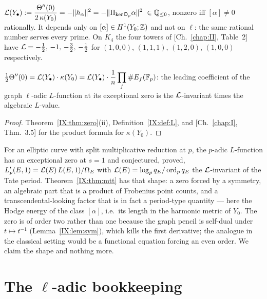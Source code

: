 \begin{definition}\label{IX:def:L}
$\displaystyle\mathcal{L}(Y_\bullet):=\frac{\Theta''(0)}{2\,\kappa(Y_0)}=-\|h_\alpha\|^{2}
=-\|\Pi_{\ker\mathsf D_p}\alpha\|^{2}\ \in\mathbb{Q}_{\le0}$, nonzero iff $[\alpha]\neq0$
rationally. It depends only on $[\alpha]\in H^{1}(Y_0;\mathbb{Z})$ and not on $\ell$: the same
rational number serves every prime. On $K_4$ the four towers of [Ch.~\ref{chap:II}, Table~2] have
$\mathcal{L}=-\frac12,\,-1,\,-\frac32,\,-\frac12$ for $(1,0,0)$, $(1,1,1)$, $(1,2,0)$, $(1,0,0)$
respectively.
\end{definition}

\begin{theorem}\label{IX:thm:mtt}
$\displaystyle\tfrac12\Theta''(0)=\mathcal{L}(Y_\bullet)\cdot\kappa(Y_0)
=\mathcal{L}(Y_\bullet)\cdot\frac1n\prod_f\#E_f(\mathbb{F}_p)$: the leading coefficient of the graph
$\ell$-adic $L$-function at its exceptional zero is the $\mathcal{L}$-invariant times the
algebraic $L$-value.
\end{theorem}

\begin{proof}
Theorem~\ref{IX:thm:zero}(ii), Definition~\ref{IX:def:L}, and [Ch.~\ref{chap:I}, Thm.~3.5] for the product
formula for $\kappa(Y_0)$.
\end{proof}

\begin{remark}\label{IX:rem:analogy}
For an elliptic curve with split multiplicative reduction at $p$, the $p$-adic
$L$-function has an exceptional zero at $s=1$ and \cite{MTT} conjectured, \cite{GS}
proved, $L_p'(E,1)=\mathcal{L}(E)\,L(E,1)/\Omega_E$ with $\mathcal{L}(E)=\log_pq_E/\operatorname{ord}_pq_E$ the
$\mathcal{L}$-invariant of the Tate period. Theorem~\ref{IX:thm:mtt} has that shape: a zero forced
by a symmetry, an algebraic part that is a product of Frobenius point counts, and a
transcendental-looking factor that is in fact a period-type quantity --- here the Hodge
energy of the class $[\alpha]$, i.e.\ its length in the harmonic metric of $Y_0$. The
zero is of order two rather than one because the graph pencil is self-dual under
$t\mapsto t^{-1}$ (Lemma~\ref{IX:lem:sym}), which kills the first derivative; the analogue
in the classical setting would be a functional equation forcing an even order. We
claim the shape and nothing more.
\end{remark}

\section{\texorpdfstring{The $\ell$-adic bookkeeping}{The l-adic bookkeeping}}\label{IX:sec:book}

